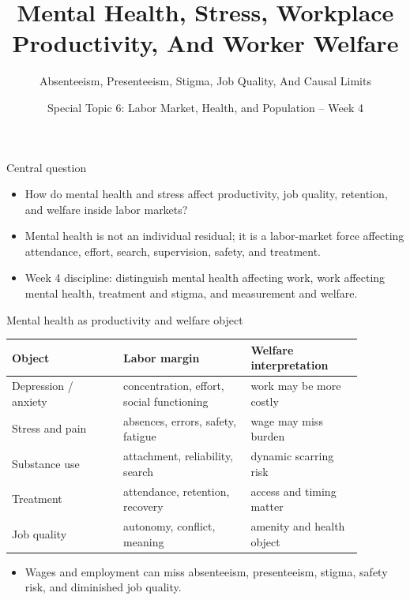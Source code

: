 \documentclass[aspectratio=169,11pt]{beamer}
\title{Mental Health, Stress, Workplace Productivity, And Worker Welfare}
\subtitle{Absenteeism, Presenteeism, Stigma, Job Quality, And Causal Limits}
\author{Special Topic 6: Labor Market, Health, and Population -- Week 4}
\date{}
\begin{document}
\begin{frame}
  \titlepage
\end{frame}

\begin{frame}{Central question}
\begin{itemize}
    \item How do mental health and stress affect productivity, job quality, retention, and welfare inside labor markets?
    \item Mental health is not an individual residual; it is a labor-market force affecting attendance, effort, search, supervision, safety, and treatment.
    \item Week 4 discipline: distinguish mental health affecting work, work affecting mental health, treatment and stigma, and measurement and welfare.
\end{itemize}
\end{frame}

\begin{frame}{Mental health as productivity and welfare object}
\small
\begin{tabular}{p{0.28\linewidth} p{0.32\linewidth} p{0.28\linewidth}}
\toprule
Object & Labor margin & Welfare interpretation \\
\midrule
Depression / anxiety & concentration, effort, social functioning & work may be more costly \\
Stress and pain & absences, errors, safety, fatigue & wage may miss burden \\
Substance use & attachment, reliability, search & dynamic scarring risk \\
Treatment & attendance, retention, recovery & access and timing matter \\
Job quality & autonomy, conflict, meaning & amenity and health object \\
\bottomrule
\end{tabular}
\vspace{0.25cm}
\begin{itemize}
    \item Wages and employment can miss absenteeism, presenteeism, stigma, safety risk, and diminished job quality.
\end{itemize}
\end{frame}
\end{document}
